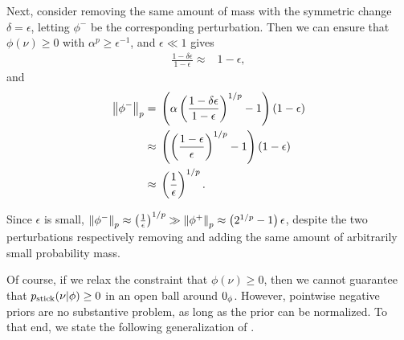\begin{ex}
Next, consider removing the same amount of mass with the symmetric change
$\delta = \epsilon$, letting $\phi^-$ be the corresponding perturbation. Then we
can ensure that $\phi(\nu) \ge 0$ with $\alpha^p \ge \epsilon^{-1}$, and
$\epsilon \ll 1$ gives
%
\begin{align*}
%
\frac{1-\delta\epsilon}{1 - \epsilon} \approx{}& 1- \epsilon,
%
\end{align*}
%
and
%
\begin{align*}
%
\norm{\phi^-}_p  ={}&
    \left( \alpha\left(\frac{1-\delta \epsilon}{1-\epsilon} \right)^{1/p} - 1
    \right) (1- \epsilon)
\\\approx{}&
\left(\left(\frac{1- \epsilon}{\epsilon}  \right)^{1/p} - 1\right)(1 - \epsilon)
%
\\\approx{}&
    \left( \frac{1}{\epsilon}\right)^{1/p}.
%
\end{align*}

Since $\epsilon$ is small, $\left\Vert\phi^-\right\Vert_p \approx \left(
\frac{1}{\epsilon}\right)^{1/p} \gg \left\Vert\phi^+\right\Vert_p \approx \left( 2^{1/p} - 1
\right) \epsilon$, despite the two perturbations respectively removing and
adding the same amount of arbitrarily small probability mass.

\end{ex}


Of course, if we relax the constraint that $\phi(\nu) \ge 0$, then
we cannot guarantee that $p_{\mathrm{stick}}(\nu \vert \phi) \ge 0$ in an open ball
around $0_\phi$.  However, pointwise negative priors are no substantive
problem, as long as the prior can be normalized.  To that end, we state
the following generalization of \citep[Result 2]{gustafson:1996:local}.


